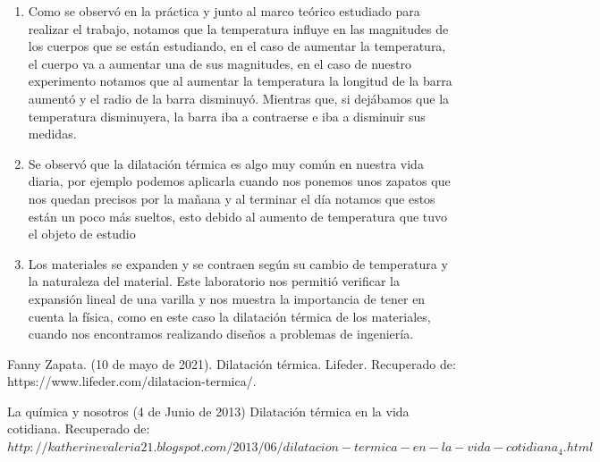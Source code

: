 \documentclass[journal,transmag]{IEEEtran}
\begin{document}
	\begin{enumerate}[label=(\roman*)]
	
    \item Como se observó en la práctica y junto al marco teórico estudiado para realizar el trabajo, notamos que la temperatura influye en las magnitudes de los cuerpos que se están estudiando, en el caso de aumentar la temperatura, el cuerpo va a aumentar una de sus magnitudes, en el caso de nuestro experimento notamos que al aumentar la temperatura la longitud de la barra aumentó y el radio de la barra disminuyó. Mientras que, si dejábamos que la temperatura disminuyera, la barra iba a contraerse e iba a disminuir sus medidas.
    \item  Se observó que la dilatación térmica es algo muy común en nuestra vida diaria, por ejemplo podemos aplicarla cuando nos ponemos unos zapatos que nos quedan precisos por la mañana y al terminar el día notamos que estos están un poco más sueltos, esto debido al aumento de temperatura que tuvo el objeto de estudio
    
    \item  Los materiales se expanden y se contraen según su cambio de temperatura y la naturaleza del material. Este laboratorio nos permitió verificar la expansión lineal de una varilla y nos muestra la importancia de tener en cuenta la física, como en este caso la dilatación térmica de los materiales, cuando nos encontramos realizando diseños a problemas de ingeniería.  
    


	\end{enumerate}

\appendices


\ifCLASSOPTIONcaptionsoff
  \newpage
\fi


\begin{thebibliography}{1}


  Fanny Zapata. (10 de mayo de 2021). Dilatación térmica. Lifeder. Recuperado de: https://www.lifeder.com/dilatacion-termica/. 

 La química y nosotros  (4 de Junio de 2013) Dilatación térmica en la vida cotidiana. Recuperado de: $http://katherinevaleria21.blogspot.com/2013/06/dilatacion-termica-en-la-vida-cotidiana_4.html $
\end{thebibliography}
\end{document}
